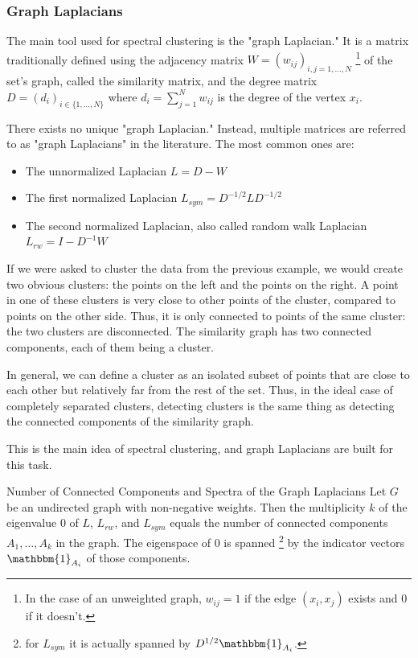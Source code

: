 \documentclass[a4paper,12pt]{article}
\theoremstyle{definition}
\theoremstyle{plain}
\begin{document}
\subsubsection{Graph Laplacians}
The main tool used for spectral clustering is the "graph Laplacian." It is a matrix traditionally defined using the adjacency matrix $W=(w_{ij})_{i,j=1,\ldots,N}$ \footnote{In the case of an unweighted graph, $w_{ij}=1$ if the edge $(x_i,x_j)$ exists and $0$ if it doesn't.} of the set's graph, called the similarity matrix, and the degree matrix $D=(d_i)_{i \in \{1,\ldots, N\}}$ where $d_i=\sum_{j=1}^{N}w_{ij}$ is the degree of the vertex $x_i$.
		
There exists no unique "graph Laplacian." Instead, multiple matrices are referred to as "graph Laplacians" in the literature. The most common ones are:
		
\begin{itemize}
	\item The unnormalized Laplacian $L = D - W$
	\item The first normalized Laplacian $L_{sym}=D^{-1/2}LD^{-1/2}$
	\item The second normalized Laplacian, also called random walk Laplacian $L_{rw}= I - D^{-1}W$
\end{itemize}
		
If we were asked to cluster the data from the previous example, we would create two obvious clusters: the points on the left and the points on the right. A point in one of these clusters is very close to other points of the cluster, compared to points on the other side. Thus, it is only connected to points of the same cluster: the two clusters are disconnected. The similarity graph has two connected components, each of them being a cluster.
		
In general, we can define a cluster as an isolated subset of points that are close to each other but relatively far from the rest of the set. Thus, in the ideal case of completely separated clusters, detecting clusters is the same thing as detecting the connected components of the similarity graph.
		
This is the main idea of spectral clustering, and graph Laplacians are built for this task.
	
\begin{theo*}{Number of Connected Components and Spectra of the Graph Laplacians} \label{con_theo}
Let $G$ be an undirected graph with non-negative weights. Then the multiplicity $k$ of the eigenvalue $0$ of $L$, $L_{rw}$, and $L_{sym}$ equals the number of connected components $A_1, \hdots, A_k$ in the graph. The eigenspace of $0$ is spanned \footnote{for $L_{sym}$ it is actually spanned by $D^{1/2} \mathbbm{1}_{A_i}$.} by the indicator vectors $\mathbbm{1}_{A_i}$ of those components.
\end{theo*}
	
\end{document}
